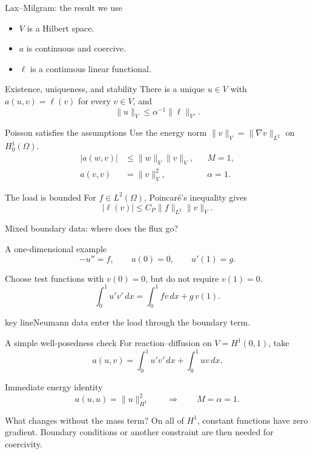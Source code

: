 \documentclass[aspectratio=169,11pt]{beamer}
\newcommand{\key}[1]{\par\vspace{4mm}\begin{beamercolorbox}[sep=2.5mm,wd=\textwidth]{key line}\normalsize #1\end{beamercolorbox}}
\begin{document}
\begin{frame}{Lax--Milgram: the result we use}
\begin{itemize}
\item $V$ is a Hilbert space.
\item $a$ is continuous and coercive.
\item $\ell$ is a continuous linear functional.
\end{itemize}\begin{exampleblock}{Existence, uniqueness, and stability}
There is a unique $u\in V$ with $a(u,v)=\ell(v)$ for every $v\in V$, and\[
\boxed{\|u\|_V\le\alpha^{-1}\|\ell\|_{V\prime}.}
\]
\end{exampleblock}
\end{frame}

\begin{frame}{Poisson satisfies the assumptions}
Use the energy norm $\|v\|_V=\|\nabla v\|_{L^2}$ on $H_0^1(\Omega)$.\[
\begin{aligned}|a(w,v)|&\le\|w\|_V\|v\|_V, && M=1,\\[2mm]a(v,v)&=\|v\|_V^2, &&\alpha=1.\end{aligned}
\]\begin{exampleblock}{The load is bounded}
For $f\in L^2(\Omega)$, Poincar\'e's inequality gives\[
|\ell(v)|\le C_P\|f\|_{L^2}\|v\|_V.
\]
\end{exampleblock}
\end{frame}

\begin{frame}{Mixed boundary data: where does the flux go?}
\begin{block}{A one-dimensional example}
\[
-u''=f,\qquad u(0)=0,\qquad u'(1)=g.
\]
\end{block}Choose test functions with $v(0)=0$, but do not require $v(1)=0$.\[
\boxed{\int_0^1u'v'\,dx=\int_0^1fv\,dx+g\,v(1).}
\]\key{Neumann data enter the load through the boundary term.}
\end{frame}

\begin{frame}{A simple well-posedness check}
For reaction--diffusion on $V=H^1(0,1)$, take\[
a(u,v)=\int_0^1u'v'\,dx+\int_0^1uv\,dx.
\]\begin{exampleblock}{Immediate energy identity}
\[
a(u,u)=\|u\|_{H^1}^2\qquad\Longrightarrow\qquad M=\alpha=1.
\]
\end{exampleblock}\begin{alertblock}{What changes without the mass term?}
On all of $H^1$, constant functions have zero gradient. Boundary conditions or another constraint are then needed for coercivity.
\end{alertblock}
\end{frame}
\end{document}
